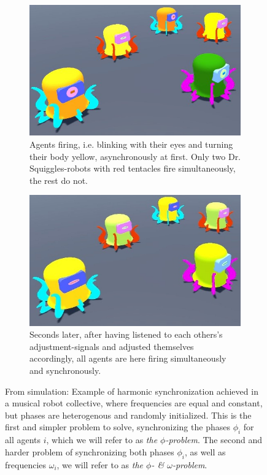 	\begin{figure}[ht!]
		\centering
			\begin{subfigure}[t]{.5\textwidth}
				\centering\captionsetup{width=.9\linewidth}%
				\includegraphics[width=0.9\linewidth]{Assets/Figures/IntroUnsynch.jpg}
				\caption{Agents firing, i.e. blinking with their eyes and turning their body yellow, asynchronously at first. Only two Dr. Squiggles-robots with red tentacles fire simultaneously, the rest do not.}
				\label{fig:first_idea:second_fig:unsynched}
			\end{subfigure}%
			\begin{subfigure}[t]{.5\textwidth}
				\centering\captionsetup{width=.9\linewidth}%
				\includegraphics[width=0.9\linewidth]{Assets/Figures/IntroSynch.jpg}
				\caption{Seconds later, after having listened to each others's adjustment-signals and adjusted themselves accordingly, all agents are here firing simultaneously and synchronously.}
				\label{fig:first_idea:second_fig:synched}
			\end{subfigure}
		\caption{From simulation: Example of harmonic synchronization achieved in a musical robot collective, where frequencies are equal and constant, but phases are heterogenous and randomly initialized. This is the first and simpler problem to solve, synchronizing the phases $\phi_i$ for all agents $i$, which we will refer to as \textit{the $\phi$-problem}. The second and harder problem of synchronizing both phases $\phi_i$, as well as frequencies $\omega_i$, we will refer to as \textit{the $\phi$- \& $\omega$-problem}.}
		\label{fig:first_idea:second_fig}
	\end{figure}

